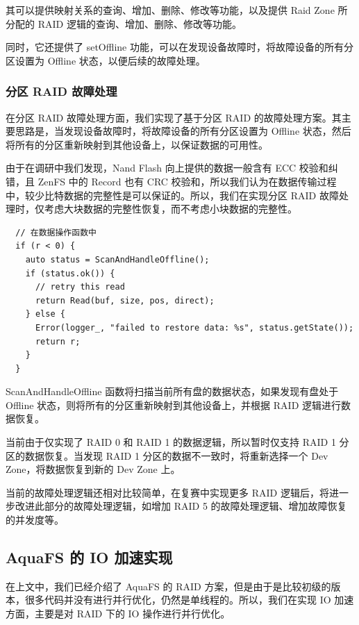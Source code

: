 其可以提供映射关系的查询、增加、删除、修改等功能，以及提供 Raid Zone 所分配的 RAID 逻辑的查询、增加、删除、修改等功能。

同时，它还提供了 setOffline 功能，可以在发现设备故障时，将故障设备的所有分区设置为 Offline 状态，以便后续的故障处理。

\subsubsection{分区 RAID 故障处理}

在分区 RAID 故障处理方面，我们实现了基于分区 RAID 的故障处理方案。其主要思路是，当发现设备故障时，将故障设备的所有分区设置为 Offline 状态，然后将所有的分区重新映射到其他设备上，以保证数据的可用性。

由于在调研中我们发现，Nand Flash 向上提供的数据一般含有 ECC 校验和纠错，且 ZenFS 中的 Record 也有 CRC 校验和，所以我们认为在数据传输过程中，较少比特数据的完整性是可以保证的。所以，我们在实现分区 RAID 故障处理时，仅考虑大块数据的完整性恢复，而不考虑小块数据的完整性。

\begin{lstlisting}
  // 在数据操作函数中
  if (r < 0) {
    auto status = ScanAndHandleOffline();
    if (status.ok()) {
      // retry this read
      return Read(buf, size, pos, direct);
    } else {
      Error(logger_, "failed to restore data: %s", status.getState());
      return r;
    }
  }
\end{lstlisting}

ScanAndHandleOffline 函数将扫描当前所有盘的数据状态，如果发现有盘处于 Offline 状态，则将所有的分区重新映射到其他设备上，并根据 RAID 逻辑进行数据恢复。

当前由于仅实现了 RAID 0 和 RAID 1 的数据逻辑，所以暂时仅支持 RAID 1 分区的数据恢复。当发现 RAID 1 分区的数据不一致时，将重新选择一个 Dev Zone，将数据恢复到新的 Dev Zone 上。

当前的故障处理逻辑还相对比较简单，在复赛中实现更多 RAID 逻辑后，将进一步改进此部分的故障处理逻辑，如增加 RAID 5 的故障处理逻辑、增加故障恢复的并发度等。

\subsection{AquaFS 的 IO 加速实现}

在上文中，我们已经介绍了 AquaFS 的 RAID 方案，但是由于是比较初级的版本，很多代码并没有进行并行优化，仍然是单线程的。所以，我们在实现 IO 加速方面，主要是对 RAID 下的 IO 操作进行并行优化。


